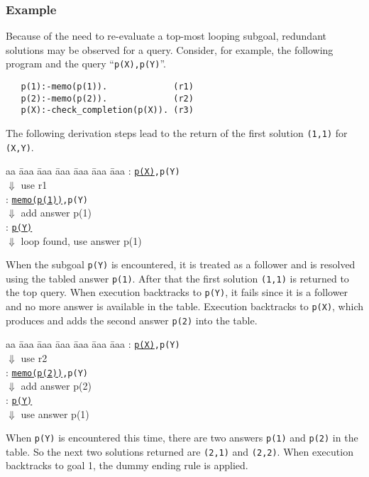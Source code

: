\documentclass{tlp}
\begin{document}
\subsubsection{Example}
Because of the need to re-evaluate a top-most looping subgoal, redundant solutions may be observed for a query. Consider, for example, the following program and the query ``{\tt p(X),p(Y)}''.
\begin{verbatim}
   p(1):-memo(p(1)).             (r1)
   p(2):-memo(p(2)).             (r2)       
   p(X):-check_completion(p(X)). (r3)
\end{verbatim}
The following derivation steps lead to the return of the first solution {\tt (1,1)} for {\tt (X,Y)}.
\begin{tabbing}
aa \= aaa \= aaa \= aaa \= aaa \= aaa \= aaa \kill
\> : {\tt \underline{p(X)},p(Y)} \\
\> \> \> $\Downarrow$ {\scriptsize use r1} \\
\> : {\tt \underline{memo(p(1))},p(Y)} \\ 
\> \> \> $\Downarrow$ {\scriptsize add answer p(1)} \\
\> : {\tt \underline{p(Y)}} \\ 
\> \> \> $\Downarrow$ {\scriptsize loop found, use answer p(1)} \\
\end{tabbing}      
When the subgoal {\tt p(Y)} is encountered, it is treated as a follower and is resolved using the tabled answer {\tt p(1)}. After that the first solution {\tt (1,1)} is returned to the top query. When execution backtracks to {\tt p(Y)}, it fails since it is a follower and no more answer is available in the table. Execution backtracks to {\tt p(X)}, which produces and adds the second answer {\tt p(2)} into the table.
\begin{tabbing}
aa \= aaa \= aaa \= aaa \= aaa \= aaa \= aaa \kill
\> : {\tt \underline{p(X)},p(Y)} \\
\> \> \> $\Downarrow$ {\scriptsize use r2} \\
\> : {\tt \underline{memo(p(2))},p(Y)} \\ 
\> \> \> $\Downarrow$ {\scriptsize add answer p(2)} \\
\> : {\tt \underline{p(Y)}} \\ 
\> \> \> $\Downarrow$ {\scriptsize use answer p(1)} \\
\end{tabbing}      
When {\tt p(Y)} is encountered this time, there are two answers {\tt p(1)} and {\tt p(2)} in the table. So the next two solutions returned are {\tt (2,1)} and {\tt (2,2)}. When execution backtracks to goal 1, the dummy ending rule is applied.
\end{document}
